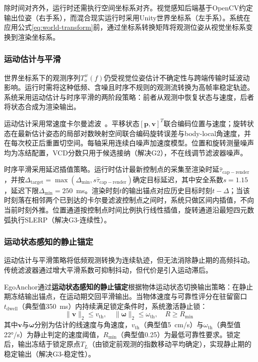 \documentclass[review]{vgtc}
\begin{document}
除时间对齐外，运行时还需执行空间坐标系对齐。视觉感知后端基于OpenCV约定输出位姿（右手系），而混合现实运行时采用Unity世界坐标系（左手系）。系统在应用公式\ref{eq:world-transform}前，通过坐标系转换矩阵将观测位姿从视觉坐标系变换到渲染坐标系。

\subsubsection{运动估计与平滑}\label{sec:smoothing}

世界坐标系下的观测序列${T_o^w (f)}$仍受视觉位姿估计不确定性与跨端传输时延波动影响。运行时需将这种低频、含噪且时序不规则的观测流转换为高帧率稳定轨迹。系统采用运动估计与时序平滑的两阶段策略：前者从观测中恢复状态与速度，后者将状态合成为渲染输出。

运动估计采用常速度卡尔曼滤波~\cite{kalman1960new}。平移状态$[\mathbf{p},\mathbf{v}]^T$联合编码位置与速度；旋转状态在最新估计姿态的局部对数映射空间联合编码旋转误差与body-local角速度，并在每次校正后重置切空间。每轴采用连续白噪声加速度模型。位置和旋转测量噪声均为冻结配置，VCD分数只用于候选接纳（解决G2），不在线调节滤波器噪声。

时序平滑采用延迟插值策略。运行时估计最新控制点的采集至渲染时延$\widehat{\tau}_{\mathrm{cap-render}}$，并按$\Delta_{\mathrm{target}} = \max(\Delta_{\mathrm{min}}, s \widehat{\tau}_{\mathrm{cap-render}})$确定目标延迟，其中安全系数$s = 1.15$，延迟下限$\Delta_{\mathrm{min}} = 250$~ms。渲染时刻$t$的输出锚点对应历史目标时刻$t - \Delta$；当该时刻落在相邻两个已到达的卡尔曼滤波控制点之间时，系统只做区间内插值，不向当前时刻外推。位置通道按控制点时间比例执行线性插值，旋转通道沿最短四元数弧执行SLERP（解决G3-连续性）。

\subsubsection{运动状态感知的静止锚定}\label{sec:staticlock}

运动估计与平滑策略将低频观测转换为连续轨迹，但无法消除静止期的高频抖动。传统滤波器通过增大平滑系数可抑制抖动，但代价是引入运动滞后。

EgoAnchor通过\textbf{运动状态感知的静止锚定}根据物体运动状态切换输出策略：在静止期冻结输出锚点，在运动期交回平滑输出。当物体速度与可靠性评分在驻留窗口$t_{\mathrm{dwell}}$（典型值350~ms）内持续满足锁定条件时，系统激活静止锁：
\begin{equation}
\lVert \mathbf{v} \rVert_2 \leq v_{\mathrm{th}}, \quad \lVert \mathbf{\omega} \rVert_2 \leq \omega_{\mathrm{th}}, \quad R \geq R_{\mathrm{min}}
\end{equation}
其中$\mathbf{v}$与$\mathbf{\omega}$分别为估计的线速度与角速度，$v_{\mathrm{th}}$（典型值5~cm/s）与$\omega_{\mathrm{th}}$（典型值22°/s）为静止判定的速度阈值，$R_{\mathrm{min}}$（典型值0.25）为最低可靠性要求。锁定后，输出冻结于锁定原点$T_L$（由锁定前观测的指数移动平均确定），实现静止期的稳定输出（解决G3-稳定性）。
\end{document}
